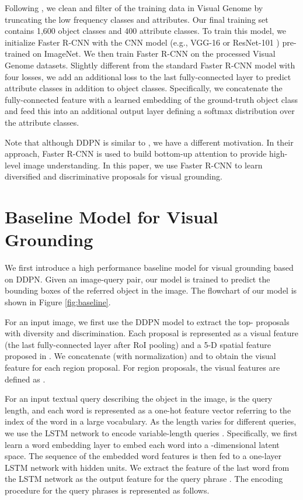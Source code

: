 \documentclass{article}
\begin{document}
Following \cite{anderson2017up-down}, we clean and filter of the training data in Visual Genome by truncating the low frequency classes and attributes. Our final training set contains 1,600 object classes and 400 attribute classes. To train this model, we initialize Faster R-CNN with the CNN model (e.g., VGG-16 \cite{simonyan2014very} or ResNet-101 \cite{he2015deep}) pre-trained on ImageNet. We then train Faster R-CNN on the processed Visual Genome datasets. Slightly different from the standard Faster R-CNN model with four losses, we add an additional loss to the last fully-connected layer to predict attribute classes in addition to object classes. Specifically, we concatenate the fully-connected feature with a learned embedding of the ground-truth object class and feed this into an additional output layer defining a softmax distribution over the attribute classes.

Note that although DDPN is similar to \cite{anderson2017up-down}, we have a different motivation. In their approach, Faster R-CNN is used to build bottom-up attention to provide high-level image understanding. In this paper, we use Faster R-CNN to learn diversified and discriminative proposals for visual grounding.

\section{Baseline Model for Visual Grounding}
We first introduce a high performance baseline model for visual grounding based on DDPN. Given an image-query pair, our model is trained to predict the bounding boxes of the referred object in the image. The flowchart of our model is shown in Figure \ref{fig:baseline}.



For an input image, we first use the DDPN model to extract the top- proposals with diversity and discrimination. Each proposal is represented as a visual feature (the last fully-connected layer after RoI pooling)  and a 5-D spatial feature  proposed in \cite{yu2016modeling}. We concatenate  (with  normalization) and  to obtain the visual feature  for each region proposal. For  region proposals, the visual features are defined as .

For an input textual query  describing the object in the image,  is the query length, and each word  is represented as a one-hot feature vector referring to the index of the word in a large vocabulary. As the length varies for different queries, we use the LSTM network to encode variable-length queries \cite{hochreiter1997long}. Specifically, we first learn a word embedding layer to embed each word into a -dimensional latent space. The sequence of the embedded word features is then fed to a one-layer LSTM network with  hidden units. We extract the feature of the last word from the LSTM network as the output feature  for the query phrase . The encoding procedure for the query phrases is represented as follows.
\end{document}
